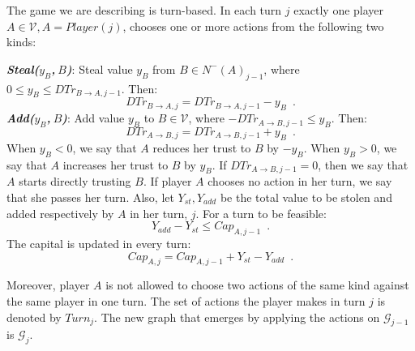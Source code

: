 {}
\begin{definition}[Turns]
  The game we are describing is turn-based. In each turn $j$ exactly one player $A \in \mathcal{V}, A =
  Player\left(j\right)$, chooses one or more actions from the following two kinds:

  \noindent \textit{\textbf{Steal($y_B$,$\:B$)}}: Steal value $y_B$ from $B \in N^{-}\left(A\right)_{j-1}$, where
  $0 \leq y_B \leq DTr_{B \rightarrow A, j-1}$. Then:
  \begin{equation*}
    DTr_{B \rightarrow A, j} = DTr_{B \rightarrow A, j-1} - y_B \enspace.
  \end{equation*}
  \noindent \textit{\textbf{Add($y_B$,$\:B$)}}:
  Add value $y_B$ to $B \in \mathcal{V}$, where $-DTr_{A \rightarrow B, j-1} \leq y_B$. Then:
  \begin{equation*}
    DTr_{A \rightarrow B, j} = DTr_{A \rightarrow B, j-1} + y_B \enspace.
  \end{equation*}
  When $y_B < 0$, we say that $A$ reduces her trust to $B$ by $-y_B$. When $y_B > 0$, we say that $A$ increases her
  trust to $B$ by $y_B$. If $DTr_{A \rightarrow B, j-1} = 0$, then we say that $A$ starts directly trusting $B$.
  If player $A$ chooses no action in her turn, we say that she passes her turn. Also, let $Y_{st}, Y_{add}$ be the
  total value to be stolen and added respectively by $A$ in her turn, $j$. For a turn to be feasible:
  \begin{equation}
    Y_{add} - Y_{st} \leq Cap_{A, j-1} \enspace.
  \end{equation}
  The capital is updated in every turn:
  \begin{equation*}
    Cap_{A, j} = Cap_{A, j-1} + Y_{st} - Y_{add} \enspace.
  \end{equation*}

  Moreover, player $A$ is not allowed to choose two actions of the same kind against the same player in one turn.
  The set of actions the player makes in turn $j$ is denoted by $Turn_j$. The new graph that emerges by applying
  the actions on $\mathcal{G}_{j-1}$ is $\mathcal{G}_j$.
\end{definition}
